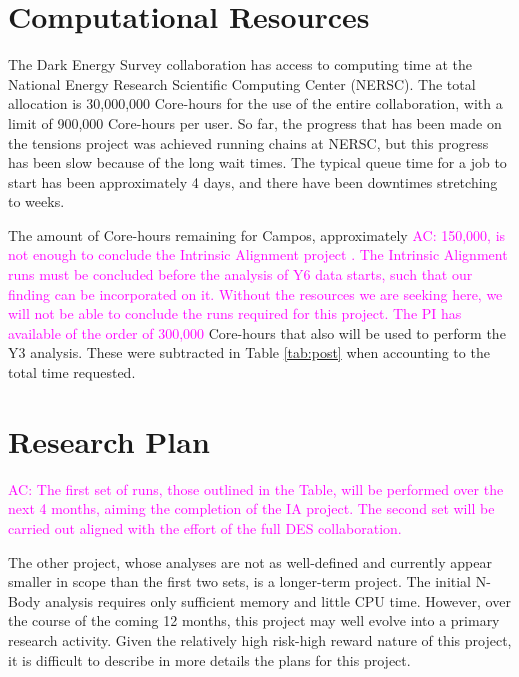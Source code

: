 \documentclass[12pt]{article}
\newcommand{\acampos}[1]{\textcolor{magenta}{AC: #1}}
\begin{document}
\begin{small}
\section{Computational Resources}

The Dark Energy Survey collaboration has access to computing time at the National Energy Research Scientific Computing Center (NERSC). The total allocation is 30,000,000 Core-hours for the use of the entire collaboration, with a  limit of 900,000 Core-hours per user. So far, the progress that has been made on the tensions project was achieved running chains at NERSC, but this progress has been slow because of the long wait times. The typical queue time for a job to start has been approximately 4 days, and there have been downtimes stretching to weeks. 

The amount of Core-hours remaining for Campos, approximately \acampos{150,000, is not enough to conclude the Intrinsic Alignment project . The Intrinsic Alignment runs must be concluded before the analysis of Y6 data starts, such that our finding can be incorporated on it. Without the resources we are seeking here, we will not be able to conclude the runs required for this project. The PI has available of the order of 300,000} Core-hours that also will be used to perform the Y3 analysis. These were subtracted in Table \ref{tab:post} when accounting to the total time requested.




\section{Research Plan}


\acampos{The first set of runs, those outlined in the Table, will be performed over the next 4 months, aiming the completion of the IA project. The second set will be carried out aligned with the effort of the full DES collaboration.}

The other project, whose analyses are not as well-defined and currently appear smaller in scope than the first two sets, is a longer-term project. The initial N-Body analysis requires only sufficient memory and little CPU time. However, over the course of the coming 12 months, this project may well evolve into a primary research activity. Given the relatively high risk-high reward nature of this project, it is difficult to describe in more details the plans for this project.


\end{small}
\end{document}
